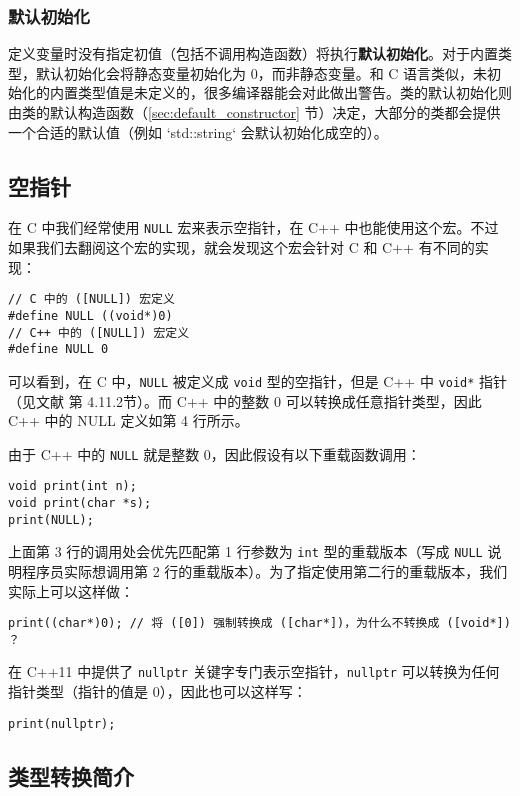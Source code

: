 \documentclass[hyperref,UTF8]{article}
\begin{document}
\subsubsection{默认初始化} \label{sec:default_init}

定义变量时没有指定初值（包括不调用构造函数）将执行\textbf{默认初始化}。对于内置类型，默认初始化会将静态变量初始化为 0，而非静态变量。和 C 语言类似，未初始化的内置类型值是未定义的，很多编译器能会对此做出警告。类的默认初始化则由类的默认构造函数（\ref{sec:default_constructor} 节）决定，大部分的类都会提供一个合适的默认值（例如 `std::string` 会默认初始化成空的）。

\subsection{空指针}

在 C 中我们经常使用 \texttt{NULL} 宏来表示空指针，在 C++ 中也能使用这个宏。不过如果我们去翻阅这个宏的实现，就会发现这个宏会针对 C 和 C++ 有不同的实现：
\begin{lstlisting}
// C 中的 ([NULL]) 宏定义
#define NULL ((void*)0)
// C++ 中的 ([NULL]) 宏定义
#define NULL 0
\end{lstlisting}
可以看到，在 C 中，\texttt{NULL} 被定义成 \texttt{void} 型的空指针，但是 C++ 中 \texttt{void*} 指针（见文献 \cite{Lippman2013C} 第 4.11.2节）。而 C++ 中的整数 0 可以转换成任意指针类型，因此 C++ 中的 NULL 定义如第 4 行所示。

由于 C++ 中的 \texttt{NULL} 就是整数 0，因此假设有以下重载函数调用：
\begin{lstlisting}
void print(int n);
void print(char *s);
print(NULL);
\end{lstlisting}
上面第 3 行的调用处会优先匹配第 1 行参数为 \texttt{int} 型的重载版本（写成 \texttt{NULL} 说明程序员实际想调用第 2 行的重载版本）。为了指定使用第二行的重载版本，我们实际上可以这样做：
\begin{lstlisting}[numbers=none]
print((char*)0); // 将 ([0]) 强制转换成 ([char*])，为什么不转换成 ([void*]) ？
\end{lstlisting}
在 C++11 中提供了 \texttt{nullptr} 关键字专门表示空指针，\texttt{nullptr} 可以转换为任何指针类型（指针的值是 0），因此也可以这样写：
\begin{lstlisting}[numbers=none]
print(nullptr);
\end{lstlisting}

\subsection{类型转换简介}
\end{document}
